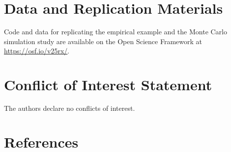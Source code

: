 \documentclass[
  american,
  man, donotrepeattitle,floatsintext]{apa7}
\begin{document}
\section*{Data and Replication Materials}\label{data-and-replication-materials}

Code and data for replicating the empirical example and the Monte Carlo simulation study are available on the Open Science Framework at \url{https://osf.io/v25rx/}.

\section*{Conflict of Interest Statement}\label{conflict-of-interest-statement}

The authors declare no conflicts of interest.

\section*{References}\label{references}

\begingroup
\setlength{\parindent}{-0.5in}
\end{document}
